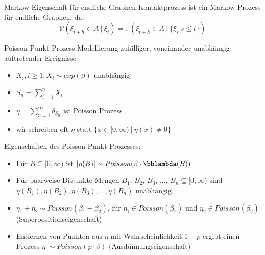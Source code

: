 \documentclass[11pt]{beamer}
\begin{document}
\begin{frame}{Markow-Eigenschaft für endliche Graphen}
    Kontaktprozess ist ein Markow Prozess für endliche Graphen, da:
    \[
        \mathbb{P}(\xi_{t + h} \in A\ |\ \xi_{t}) = \mathbb{P}(\xi_{t + h} \in A\ |\ \{ \xi_s\ s \leq t \})
    \]
\end{frame}

\begin{frame}{Poisson-Punkt-Prozess}
    Modellierung zufälliger, voneinander unabhängig auftretender Ereignisse
    \begin{itemize}
        \item $X_i, i \geq 1, X_i \sim exp(\beta)$ unabhängig
        \item $S_n = \sum_{i = 1}^n X_i$
        \item $\eta = \sum_{n = 1}^\infty \delta_{S_n}$ ist Poisson Prozess
        \item wir schreiben oft $\eta$ statt $\{x \in [0, \infty)\ |\ \eta(x) \not= 0 \}$
    \end{itemize}
\end{frame}
\begin{frame}
    Eigenschaften des Poisson-Punkt-Prozesses:
    \begin{itemize}
        \item [(i)]<2-> Für $B \subseteq [0, \infty)$ ist $|\eta(B)| \sim Poisson(\beta \cdot \bblambda(B))$  
        \item [(ii)]<3-> Für paarweise Disjunkte Mengen $B_1$, $B_2$, $B_3$, ..., $B_n \subseteq [0, \infty)$ 
        sind $\eta(B_1), \eta(B_2), \eta(B_3), ..., \eta(B_n)$ unabhängig.
        \item [(iii)]<4-> $\eta_1 + \eta_2 \sim Poisson(\beta_1 + \beta_2)$, für
        $\eta_1 \in Poisson(\beta_1)$ und $\eta_2 \in Poisson(\beta_2)$
        (Superpositionseigenschaft)
        \item [(iv)]<5-> Entfernen von Punkten aus $\eta$ mit Wahrscheinlichkeit $1 - p$ ergibt einen Prozess $\eta^\prime \sim Poisson(p \cdot \beta)$ (Ausdünnungseigenschaft)
    \end{itemize}
\end{frame}

\end{document}
